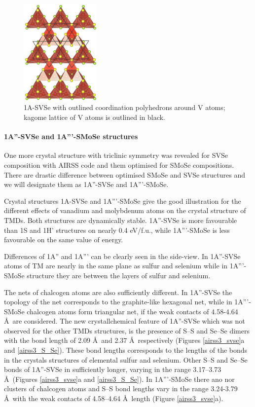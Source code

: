 \documentclass[a4paperm]{article}
\begin{document}
\begin{figure}[H]
        \includegraphics[width=0.35\textwidth]{airss1_v_poly.png}
        \caption{1A-SVSe with outlined coordination polyhedrons around V atoms; kagome lattice of V atoms is outlined in black.}
\label{airss1_poly}
\end{figure}




\paragraph{1A''-SVSe and 1A'''-SMoSe structures}
One more crystal structure with triclinic symmetry was revealed for SVSe composition with AIRSS code and them optimised for SMoSe compositions.
There are drastic difference between optimised SMoSe and SVSe structures and we will designate them as 1A''-SVSe and 1A'''-SMoSe.

Crystal structures  1A-SVSe and 1A'''-SMoSe give the good illustration for the different effects of vanadium and molybdenum atoms on the crystal structure of TMDs.
Both structures are dynamically stable.
1A''-SVSe is more favourable than 1S and 1H' structures on nearly 0.4 eV/f.u., while 1A'''-SMoSe is less favourable on the same value of energy.

Differences of 1A'' and 1A''' can be clearly seen in the side-view.
In 1A''-SVSe atoms of TM are nearly in the same plane as sulfur and selenium while in 1A'''-SMoSe structure they are between the layers of sulfur and selenium.

The nets of chalcogen atoms are also sufficiently different.
In 1A''-SVSe the topology of the net corresponds to the graphite-like hexagonal net, while in 1A'''-SMoSe chalcogen atoms form triangular net, if the weak contacts of 4.58-4.64 \AA\ are considered.
The new crystallchemical feature of 1A''-SVSe which was not observed for the other TMDs structures, is the presence of S--S and Se--Se dimers with the bond length of 2.09 \AA\ and 2.37 \AA\, respectively (Figures \ref{airss3_svse}a and \ref{airss3_S_Se}).
These bond lengths corresponds to the lengths of the bonds in the crystals structures of elemental sulfur and selenium.
Other S--S and Se--Se bonds of 1A''-SVSe in  sufficiently longer, varying in the range 3.17--3.73 \AA\ (Figures \ref{airss3_svse}a and \ref{airss3_S_Se}).
In 1A'''-SMoSe there ano nor clusters of chalcogen atoms and S--S bond lengths vary in the range 3.24-3.79 \AA\ with the weak contacts of 4.58--4.64 \AA\ length (Figure \ref{airss3_svse}a).
\end{document}
